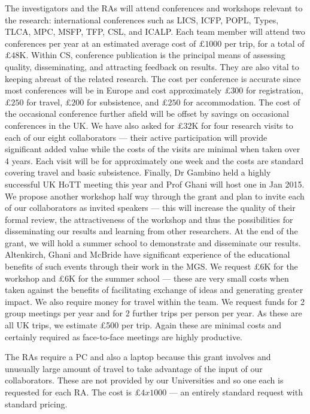 \documentclass[a4paper,11pt]{article}
\begin{document}
 The investigators and the RAs will
attend conferences and workshops relevant to the research:
international conferences such as LICS, ICFP, POPL, Types, TLCA, MPC,
MSFP, TFP, CSL, and ICALP. Each team member will attend two
conferences per year at an estimated average cost of $\pounds 1000$
per trip, for a total of $\pounds 48$K. Within CS, conference
publication is the principal means of assessing quality,
disseminating, and attracting feedback on results. They are also vital
to keeping abreast of the related research. The cost per conference is
accurate since most conferences will be in Europe and cost
approximately $\pounds 300$ for registration, $\pounds 250$ for
travel, $\pounds 200$ for subsistence, and $\pounds 250$ for
accommodation. The cost of the occasional conference further afield
will be offset by savings on occasional conferences in the UK. We have
also asked for $\pounds 32$K for four research visits to each of our
eight collaborators --- their active participation will provide
significant added value while the costs of the visits are minimal when
taken over 4 years. Each visit will be for approximately one week and
the costs are standard covering travel and basic subsistence. Finally,
Dr Gambino held a highly successful UK HoTT meeting this year and Prof
Ghani will host one in Jan 2015. We propose another
workshop half way through the grant and plan to invite each of our
collaborators as invited speakers --- this will increase the quality
of their formal review, the
attractiveness of the workshop and thus the possibilities for
disseminating our results and learning from other researchers. At the
end of the grant, we will hold a summer school to demonstrate and
disseminate our results. Altenkirch, Ghani and McBride have
significant experience of the educational benefits of such 
events through their work in the MGS. We request \pounds 6K for
the workshop and \pounds 6K for the summer school --- these
are very small costs when taken against the benefits of 
facilitating exchange of ideas and generating greater
impact. We also require money for travel within the 
team. We request funds for 2 group meetings per year and for 2
further trips per person per year. As these are all UK trips, we
estimate \pounds 500 per trip. Again these are minimal costs and
certainly required as face-to-face meetings are highly productive.

\vspace{0.02in}

 The RAs require a PC and also a
laptop because this grant involves and unusually large amount of travel to take
advantage of the input of our collaborators. These are not provided by
our Universities and so one each is requested for each RA. The cost is
$\pounds 4x1000$ --- an entirely standard request with standard
pricing. 
\end{document}
